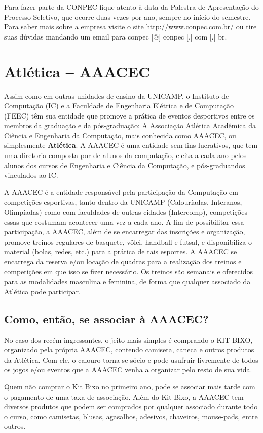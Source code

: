 \documentclass[a4paper,10pt]{article}
\begin{document}
Para fazer parte da CONPEC fique atento à data da Palestra de Apresentação do
Processo Seletivo, que ocorre duas vezes por ano, sempre no início do semestre.
Para saber mais sobre a empresa visite o site \url{http://www.conpec.com.br/} ou
tire suas dúvidas mandando um email para conpec [@] conpec [.] com [.] br.

\section{Atlética -- AAACEC}
Assim como em outras unidades de ensino da UNICAMP, o Instituto de Computação
(IC) e a Faculdade de Engenharia Elétrica e de Computação (FEEC) têm sua
entidade que promove a prática de eventos desportivos entre os membros da
graduação e da pós-graduação: A Associação Atlética Acadêmica da Ciência
e Engenharia da Computação, mais conhecida como AAACEC, ou simplesmente
\textbf{Atlética}. A AAACEC é uma entidade sem fins lucrativos, que tem uma
diretoria composta por de alunos da computação, eleita a cada ano pelos alunos
dos cursos de Engenharia e Ciência da Computação, e pós-graduandos vinculados ao
IC.

A AAACEC é a entidade responsável pela participação da Computação em competições
esportivas, tanto dentro da UNICAMP (Calouríadas, Interanos, Olimpíadas) como
com faculdades de outras cidades (Intercomp), competições essas que costumam
acontecer uma vez a cada ano. A fim de possibilitar essa participação, a AAACEC,
além de se encarregar das inscrições e organização, promove treinos regulares de
basquete, vôlei, handball e futsal, e disponibiliza o material (bolas, redes,
etc.) para a prática de tais esportes. A AAACEC se encarrega da reserva e/ou
locação de quadras para a realização dos treinos e competições em que isso se
fizer necessário. Os treinos são semanais e oferecidos para as modalidades
masculina e feminina, de forma que qualquer associado da Atlética pode
participar.

\subsection{Como, então, se associar à AAACEC?}
No caso dos recém-ingressantes, o jeito mais simples é comprando o KIT BIXO,
organizado pela própria AAACEC, contendo camiseta, caneca e outros produtos da
Atlética. Com ele, o calouro torna-se sócio e pode usufruir livremente de todos
os jogos e/ou eventos que a AAACEC venha a organizar pelo resto de sua vida.

Quem não comprar o Kit Bixo no primeiro ano, pode se associar mais tarde com
o pagamento de uma taxa de associação. Além do Kit Bixo, a AAACEC tem diversos
produtos que podem ser comprados por qualquer associado durante todo o curso,
como camisetas, blusas, agasalhos, adesivos, chaveiros, mouse-pads, entre
outros.
\end{document}
